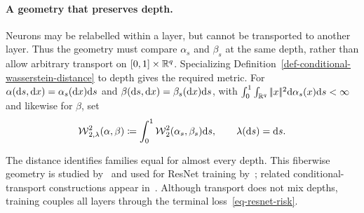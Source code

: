 \paragraph{A geometry that preserves depth.}
Neurons may be relabelled within a layer, but cannot be transported to another layer. Thus the geometry must compare $\alpha_s$ and $\beta_s$ at the same depth, rather than allow arbitrary transport on $[0,1]\times\mathbb{R}^q$.
Specializing Definition~\ref{def-conditional-wasserstein-distance} to depth gives the required metric.
For $\alpha(\mathrm{d} s,\mathrm{d} x)=\alpha_s(\mathrm{d} x)\mathrm{d} s$ and $\beta(\mathrm{d} s,\mathrm{d} x)=\beta_s(\mathrm{d} x)\mathrm{d} s$, with $\int_0^1\int_{\mathbb{R}^q}|\!| x |\!|^2\mathrm{d}\alpha_s(x)\mathrm{d} s<\infty$ and likewise for $\beta$, set
\begin{equation}\label{eq-resnet-depth-wasserstein}
  \operatorname{\mathcal{W}}_{2,\lambda}^2(\alpha,\beta)
  \coloneqq\int_0^1\operatorname{\mathcal{W}}_2^2(\alpha_s,\beta_s)\mathrm{d} s,
  \qquad \lambda(\mathrm{d} s)=\mathrm{d} s.
\end{equation}

The distance identifies families equal for almost every depth. This fiberwise geometry is studied by~\cite{PeszekPoyato2023FiberedOptimalTransport} and used for ResNet training by~\cite{BarboniPeyreVialard2024ConditionalResNets}; related conditional-transport constructions appear in~\cite{HosseiniHsuTaghvaei2023ConditionalFunctionSpaces,ChemseddineHagemannSteidlWald2024ConditionalWasserstein,KerriganMiglioriniSmyth2024DynamicConditionalOT}. Although transport does not mix depths, training couples all layers through the terminal loss~\eqref{eq-resnet-risk}.

